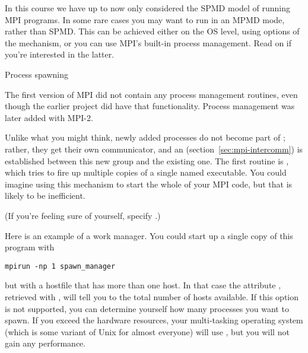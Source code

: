 
In this course we have up to now only considered the \ac{SPMD} model
of running MPI programs.  In some rare cases you may want to run in an
\ac{MPMD} mode, rather than \ac{SPMD}. This can be achieved either on
the \ac{OS} level, using options of the  mechanism,
or you can use MPI's built-in process management. Read on if you're
interested in the latter.

 {Process spawning}
\label{sec:mpi-dynamic}

The first version of MPI did not contain any process management
routines, even though the earlier  project did have
that functionality. Process management was later added with MPI-2.

Unlike what you might think, newly added processes do not become part
of ; rather, they get their own communicator, and an
 (section~\ref{sec:mpi-intercomm})
is established between this new group
and the existing one. The first routine is
, which tries to fire up multiple copies
of a single named executable. You could imagine using this mechanism
to start the whole of your MPI code, but that is likely to be inefficient.


(If you're feeling sure of yourself, specify .)

Here is an example of a work manager.
%
%
%
You could start up a single copy of this program with 
\begin{verbatim}
mpirun -np 1 spawn_manager
\end{verbatim}
but with a hostfile that has more than one host. In that case the
attribute , retrieved with
, will tell you to the total number of
hosts available. If this option is not supported, you can determine
yourself how many processes you want to spawn. If you exceed the
hardware resources, your multi-tasking operating system (which is some
variant of Unix for almost everyone) will use
, but you will not gain any performance.



